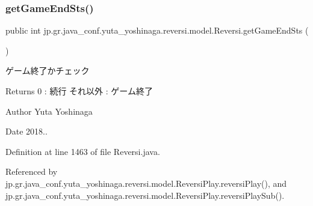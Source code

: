 \subsubsection{\texorpdfstring{get\+Game\+End\+Sts()}{getGameEndSts()}}
{\footnotesize\ttfamily public int jp.\+gr.\+java\+\_\+conf.\+yuta\+\_\+yoshinaga.\+reversi.\+model.\+Reversi.\+get\+Game\+End\+Sts (\begin{DoxyParamCaption}{ }\end{DoxyParamCaption})}



ゲーム終了かチェック 

\begin{DoxyReturn}{Returns}
0 \+: 続行 それ以外 \+: ゲーム終了 
\end{DoxyReturn}
\begin{DoxyAuthor}{Author}
Yuta Yoshinaga 
\end{DoxyAuthor}
\begin{DoxyDate}{Date}
2018.. 
\end{DoxyDate}


Definition at line 1463 of file Reversi.\+java.



Referenced by jp.\+gr.\+java\+\_\+conf.\+yuta\+\_\+yoshinaga.\+reversi.\+model.\+Reversi\+Play.\+reversi\+Play(), and jp.\+gr.\+java\+\_\+conf.\+yuta\+\_\+yoshinaga.\+reversi.\+model.\+Reversi\+Play.\+reversi\+Play\+Sub().

